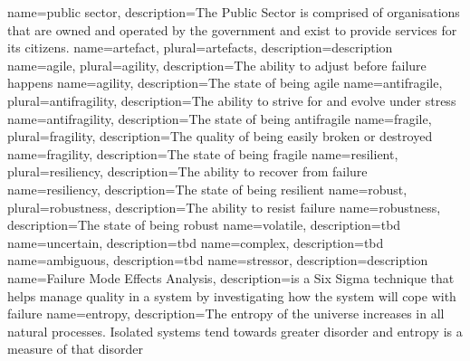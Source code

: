 {
	name={public sector},
	description={The Public Sector is comprised of organisations that are owned and operated by the government and exist to provide services for its citizens.}
}
{
	name={artefact},
	plural={artefacts},
	description={description}
}
{
	name=agile,
	plural={agility},
	description={The ability to adjust before failure happens}
}
{
	name={agility},
	description={The state of being agile}
}
{
	name=antifragile,
	plural={antifragility},
	description={The ability to strive for and evolve under stress}
}
{
	name={antifragility},
	description={The state of being antifragile}
}
{
	name=fragile,
	plural={fragility},
	description={The quality of being easily broken or destroyed}
}
{
	name={fragility},
	description={The state of being fragile}
}
{
	name=resilient,
	plural={resiliency},
	description={The ability to recover from failure}
}
{
	name={resiliency},
	description={The state of being resilient}
}
{
	name=robust,
	plural={robustness},
	description={The ability to resist failure}
}
{
	name={robustness},
	description={The state of being robust}
}
{
	name=volatile,
	description={tbd}
}
{
	name=uncertain,
	description={tbd}
}
{
	name=complex,
	description={tbd}
}
{
	name=ambiguous,
	description={tbd}
}
{
	name={stressor},
	description={description}
}
{
	name={Failure Mode Effects Analysis},
	description={is a Six Sigma technique that helps manage quality in a system by investigating how the system will cope with failure}
}
{
	name={entropy},
	description={The entropy of the universe increases in all natural processes. Isolated systems tend towards greater disorder and entropy is a measure of that disorder}
}
